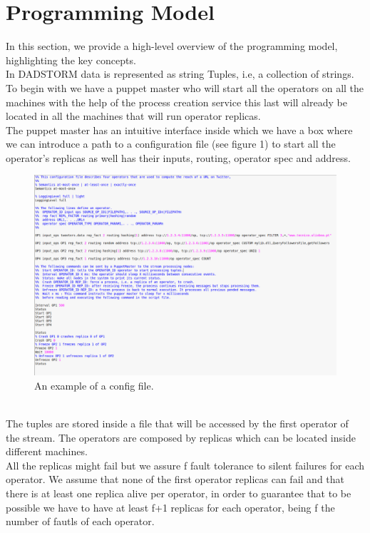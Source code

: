 \documentclass[times, 10pt, twocolumn]{article}
\begin{document}
\section{Programming Model}
In this section, we provide a high-level overview of the programming model, highlighting the key concepts. 
\\In DADSTORM data is represented as string Tuples, i.e, a collection of strings.
\\To begin with we have a puppet master who will start all the operators on all the machines with the help of the process creation service this last will already be located in all the machines that will run operator replicas.
\\The puppet master has an intuitive interface inside which we have a box where we can introduce a path to a configuration file (see figure 1) to start all the operator's replicas as well has their inputs, routing, operator spec and address.
\begin{figure}
  \includegraphics[width=\linewidth]{configFileExample.PNG}
  \caption{An example of a config file.}
\end{figure}
\\The tuples are stored inside a file that will be accessed by the first operator of the stream. The operators are composed by replicas which can be located inside different machines.
\\All the replicas might fail but we assure f fault tolerance to silent failures for each operator. We assume that none of the first operator replicas can fail and that there is at least one replica alive per operator, in order to guarantee that to be possible we have to have at least f+1 replicas for each operator, being f the number of fautls of each operator.
\end{document}
